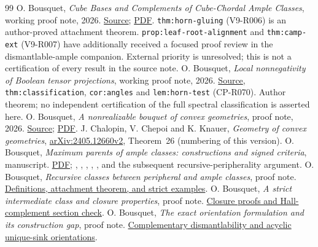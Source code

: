 \documentclass[11pt]{article}
\theoremstyle{definition}
\begin{document}
\begin{thebibliography}{99}
 O. Bousquet,
\emph{Cube Bases and Complements of Cube-Chordal Ample Classes},
working proof note, 2026.
\href{../varchenko-ample/research/cube_preserving_elimination.tex}{Source};
\href{../varchenko-ample/research/cube_preserving_elimination.pdf}{PDF}.
\texttt{thm:horn-gluing} (V9-R006) is an author-proved attachment theorem.
\texttt{prop:leaf-root-alignment} and \texttt{thm:camp-ext} (V9-R007)
have additionally received a focused proof review in the dismantlable-ample
companion. External priority is unresolved; this is not a certification
of every result in the source note.
 O. Bousquet,
\emph{Local nonnegativity of Boolean tensor projections},
working proof note, 2026.
\href{../containment-cubic-positivity/research/local_nonnegative_projections.tex}{Source},
\texttt{thm:classification}, \texttt{cor:angles} and \texttt{lem:horn-test}
(CP-R070). Author theorem; no independent certification of the full
spectral classification is asserted here.
 O. Bousquet,
\emph{A nonrealizable bouquet of convex geometries}, proof note, 2026.
\href{../../../CompressionSchemes/nonrealizable_bouquet.tex}{Source};
\href{../../../CompressionSchemes/nonrealizable_bouquet.pdf}{PDF}.
 J. Chalopin, V. Chepoi and K. Knauer,
\emph{Geometry of convex geometries},
\href{https://arxiv.org/abs/2405.12660v2}{arXiv:2405.12660v2},
Theorem~26 (numbering of this version).
 O. Bousquet,
\emph{Maximum parents of ample classes: constructions and signed criteria}, manuscript.
\href{https://research.obousquet.uk/repos/CompressionSchemes/maximum_parent_methods.pdf}{PDF};
, ,
,
, , and the
subsequent recursive-peripherality argument.
 O. Bousquet,
\emph{Recursive classes between peripheral and ample classes}, proof note.
\href{https://research.obousquet.uk/repos/CompressionSchemes/drafts/round926_structural_milestones.md.html}{Definitions, attachment theorem, and strict examples}.
 O. Bousquet,
\emph{A strict intermediate class and closure properties}, proof note.
\href{https://research.obousquet.uk/repos/CompressionSchemes/drafts/round927_structure.md.html}{Closure proofs and Hall-complement section check}.
 O. Bousquet,
\emph{The exact orientation formulation and its construction gap}, proof note.
\href{https://research.obousquet.uk/repos/CompressionSchemes/drafts/round853_uso_lift_operation_audit.md.html}{Complementary dismantlability and acyclic unique-sink orientations}.

\end{thebibliography}
\end{document}
